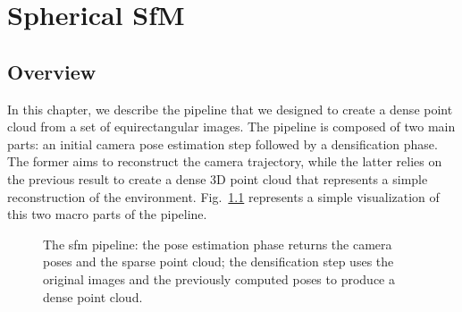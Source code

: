 \chapter{Spherical SfM}
\section{Overview}
In this chapter, we describe the pipeline that we designed to create a dense 
point cloud from a set of equirectangular images.
The pipeline is composed of two main parts: an initial camera pose estimation
step followed by a densification phase. The former aims to reconstruct the 
camera trajectory, while the latter relies on the previous result to create a dense 
3D point cloud that represents a simple reconstruction of the environment.
Fig.~\ref{fig:pipeline_overview}
represents a simple visualization of this two macro parts of the 
pipeline.
\begin{figure}
    \centering
    \def\svgwidth{\columnwidth}
    
    \caption{The sfm pipeline: the pose estimation phase returns the camera 
    poses and the sparse point cloud; the densification step uses 
    the original images and the previously computed poses to produce a dense 
    point cloud.}
	\label{fig:pipeline_overview}
\end{figure}

